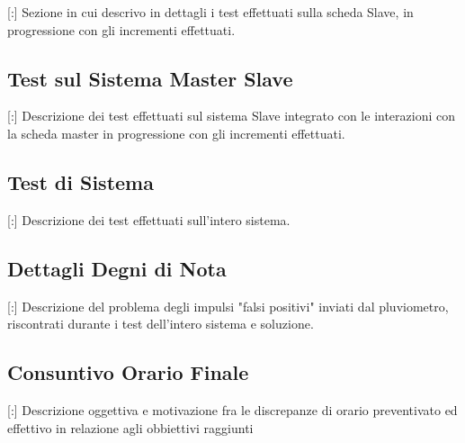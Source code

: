 [:] Sezione in cui descrivo in dettagli i test effettuati sulla scheda Slave, in progressione con gli incrementi effettuati.

\subsection{Test sul Sistema Master Slave}

[:] Descrizione dei test effettuati sul sistema Slave integrato con le interazioni con la scheda master in progressione con gli incrementi effettuati.

\subsection{Test di Sistema}

[:] Descrizione dei test effettuati sull'intero sistema.

\subsection{Dettagli Degni di Nota}

[:] Descrizione del problema degli impulsi "falsi positivi" inviati dal pluviometro, riscontrati durante i test dell'intero sistema e soluzione.

\subsection{Consuntivo Orario Finale}

[:] Descrizione oggettiva e motivazione fra le discrepanze di orario preventivato ed effettivo in relazione agli obbiettivi raggiunti